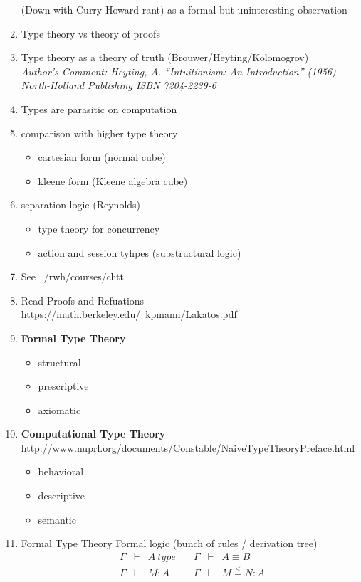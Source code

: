 \documentclass{article}
\begin{document}
\begin{enumerate}
(Down with Curry-Howard rant) as a formal but uninteresting observation
\item Type theory vs theory of proofs
\item Type theory as a theory of truth (Brouwer/Heyting/Kolomogrov)\\
{\sl Author's Comment: Heyting, A. ``Intuitionism: An Introduction''
(1956) North-Holland Publishing ISBN 7204-2239-6}
\item Types are parasitic on computation
\item comparison with higher type theory
\begin{itemize}
\item cartesian form (normal cube)
\item kleene form (Kleene algebra cube)
\end{itemize}
\item separation logic (Reynolds)
\begin{itemize}
\item type theory for concurrency
\item action and session tyhpes (substructural logic)
\end{itemize}
\item See ~/rwh/courses/chtt
\item Read Proofs and Refuations\\
\href{url}{https://math.berkeley.edu/~kpmann/Lakatos.pdf}
\item {\bf Formal Type Theory}
\begin{itemize}
\item structural
\item prescriptive
\item axiomatic
\end{itemize}
\item {\bf Computational Type Theory}\\
\href{url}{http://www.nuprl.org/documents/Constable/NaiveTypeTheoryPreface.html}
\begin{itemize}
\item behavioral
\item descriptive
\item semantic
\end{itemize}
\item Formal Type Theory
Formal logic (bunch of rules / derivation tree)
\[\begin{array}{rclrcl}
\Gamma & \vdash & A~type &\quad\Gamma & \vdash & A\equiv B\\
\Gamma & \vdash & M:A    &\quad\Gamma & \vdash & M \stackrel{<}{=} N:A

\end{array}\]
\end{enumerate}
\end{document}
